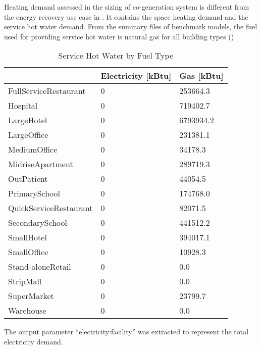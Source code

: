 Heating demand assessed in the sizing of co-generation system is
different from the energy recovery use case in 
. It contains the space heating demand and the service hot water
demand. From the summary files of benchmark models, the fuel used for
providing service hot water is natural gas for all building types
()
\begin{table}[h!]
\centering
\caption{Service Hot Water by Fuel Type}
\label{tab:hotWater}
\begin{tabular}{l|l|l}
  \hline
                       &  Electricity {[}kBtu{]} & Gas {[}kBtu{]} \\
  \hline
  \hline
FullServiceRestaurant  & 0 & 253664.3       \\
Hospital               & 0 & 719402.7       \\
LargeHotel             & 0 & 6793934.2      \\
LargeOffice            & 0 & 231381.1       \\
MediumOffice           & 0 & 34178.3        \\
MidriseApartment       & 0 & 289719.3       \\
OutPatient             & 0 & 44054.5        \\
PrimarySchool          & 0 & 174768.0       \\
QuickServiceRestaurant & 0 & 82071.5        \\
SecondarySchool        & 0 & 441512.2       \\
SmallHotel             & 0 & 394017.1       \\
SmallOffice            & 0 & 10928.3        \\
Stand-aloneRetail      & 0 & 0.0            \\
StripMall              & 0 & 0.0            \\
SuperMarket            & 0 & 23799.7        \\
Warehouse              & 0 & 0.0            \\
  \hline
\end{tabular}
\end{table}

The output parameter ``electricity:facility'' was extracted to
represent the total electricity demand.

\pagebreak

